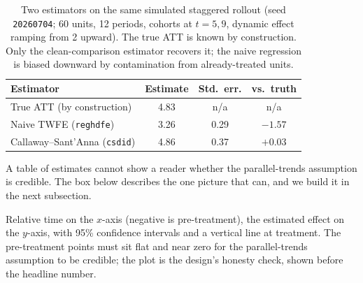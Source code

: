 \documentclass[
    a4paper,
    fontsize=10pt,
    twoside=true,
    numbers=noenddot,
]{kaobook}
\newenvironment{vizcallout}[1][Visualization to build]{%
    \begin{vizbox}[frametitle={#1}]%
}{%
    \end{vizbox}%
}
\begin{document}
\begin{table}[htbp]
\centering
\caption[TWFE vs.\ Callaway--Sant'Anna on a known truth]{Two estimators on the same simulated staggered rollout (seed \texttt{20260704}; 60 units, 12 periods, cohorts at $t{=}5,9$, dynamic effect ramping from 2 upward). The true ATT is known by construction. Only the clean-comparison estimator recovers it; the naive regression is biased downward by contamination from already-treated units.}
\label{tab:did-compare}
{\footnotesize
\begin{tabular}{lccc}
\hline
Estimator & Estimate & Std.\ err. & vs.\ truth \\
\hline
True ATT (by construction) & 4.83 & n/a & n/a \\
Naive TWFE (\texttt{reghdfe}) & 3.26 & 0.29 & $-1.57$ \\
Callaway--Sant'Anna (\texttt{csdid}) & 4.86 & 0.37 & $+0.03$ \\
\hline
\end{tabular}
}
\end{table}

A table of estimates cannot show a reader whether the parallel-trends assumption is credible. The box below describes the one picture that can, and we build it in the next subsection.

\begin{vizcallout}[Visualization to build: the event-study plot]
Relative time on the $x$-axis (negative is pre-treatment), the estimated effect on the $y$-axis, with 95\% confidence intervals and a vertical line at treatment. The pre-treatment points must sit flat and near zero for the parallel-trends assumption to be credible; the plot is the design's honesty check, shown before the headline number.
\end{vizcallout}
\end{document}
